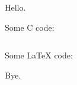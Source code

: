 \documentclass{article}
\begin{document}
Hello.  %

Some C code:


\inputminted{c}{code.c}
Some LaTeX code:

Bye.
\end{document}
